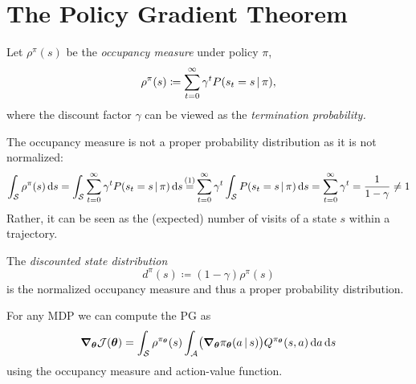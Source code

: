 	\section{The Policy Gradient Theorem}
		\begin{definition}
			Let \( \rho^\pi(s) \) be the \emph{occupancy measure} under policy \(\pi\),
			\begin{equation}
				\rho^\pi(s) \coloneqq \sum_{t = 0}^{\infty} \gamma^t P(s_t = s \,\vert\, \pi),
			\end{equation}
			where the discount factor \(\gamma\) can be viewed as the \emph{termination probability.}
		\end{definition}
		\begin{remark}
			The occupancy measure is not a proper probability distribution as it is not normalized:
			\begin{equation}
				\int_\mathcal{S} \rho^\pi(s) \dd{s}
				= \int_\mathcal{S} \sum_{t = 0}^{\infty} \gamma^t P(s_t = s \given \pi) \dd{s}
				\oversetfootnotemark{=} \sum_{t = 0}^{\infty} \gamma^t \int_\mathcal{S} P(s_t = s \given \pi) \dd{s}
				= \sum_{t = 0}^{\infty} \gamma^t
				= \frac{1}{1 - \gamma}
				\neq 1
			\end{equation}
			Rather, it can be seen as the (expected) number of visits of a state \(s\) within a trajectory.
		\end{remark}
		\begin{definition}  \label{def:discountedStateDistrib}
			The \emph{discounted state distribution}
			\begin{equation}
				d^\pi(s) \coloneqq (1 - \gamma) \rho^\pi(s)
			\end{equation}
			is the normalized occupancy measure and thus a proper probability distribution.
		\end{definition}
		\begin{theorem}  \label{th:pgt}
			For any \ac{MDP} we can compute the \ac{PG} as
			\begin{equation}
				\grad_{\bm{\theta}} \mathcal{J}(\bm{\theta}) = \int_\mathcal{S} \rho^{\pi_{\bm{\theta}}}(s) \int_\mathcal{A} \bigl( \grad_{\bm{\theta}} \pi_{\bm{\theta}}(a \,\vert\, s) \bigr) Q^{\pi_{\bm{\theta}}}(s, a) \dd{a} \dd{s}
			\end{equation}
			using the occupancy measure and action-value function.
		\end{theorem}
